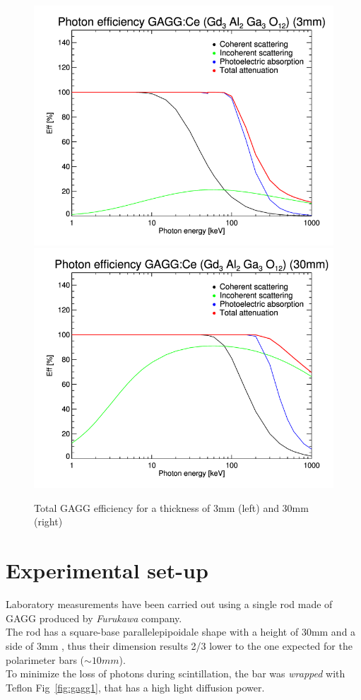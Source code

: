 \documentclass[10pt,a4paper, openany]{book}
\begin{document}
\begin{figure}[!h]
\begin{center}
\includegraphics[scale=0.26]{imm/eff_gagg_3mm.png}
\includegraphics[scale=0.26]{imm/eff_gagg_30mm.png}
\end{center}
\caption{Total GAGG efficiency for a thickness of 3mm (left) and 30mm (right)}
\label{fig:eff_gagg}
\end{figure}


\section{Experimental set-up}
Laboratory measurements have been carried out using a single rod made of GAGG produced by \emph{Furukawa} company.\\
The rod has a square-base parallelepipoidale shape with a height of 30mm and a side of 3mm , thus their dimension results 2/3 lower  to the one expected for the polarimeter bars ($\sim 10mm$).\\
To minimize the loss of photons during scintillation, the bar was \emph{wrapped} with Teflon Fig~\ref{fig:gagg1}, that has a high light diffusion power.
\end{document}
